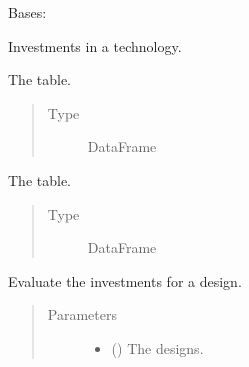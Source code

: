 \documentclass[letterpaper,10pt,english]{sphinxmanual}
\begin{document}
\begin{fulllineitems}
\label{\detokenize{doc-src/tyche:tyche.Investments.Investments}}
Bases: 

Investments in a technology.

\begin{fulllineitems}
\label{\detokenize{doc-src/tyche:tyche.Investments.Investments.tranches}}
The  table.
\begin{quote}\begin{description}
\item[{Type}] \leavevmode
DataFrame

\end{description}\end{quote}

\end{fulllineitems}


\begin{fulllineitems}
\label{\detokenize{doc-src/tyche:tyche.Investments.Investments.investments}}
The  table.
\begin{quote}\begin{description}
\item[{Type}] \leavevmode
DataFrame

\end{description}\end{quote}

\end{fulllineitems}


\begin{fulllineitems}
\label{\detokenize{doc-src/tyche:tyche.Investments.Investments.evaluate_investments}}
Evaluate the investments for a design.
\begin{quote}\begin{description}
\item[{Parameters}] \leavevmode\begin{itemize}
\item {} 
 () \textendash{} The designs.


\end{itemize}
\end{description}
\end{quote}
\end{fulllineitems}
\end{fulllineitems}
\end{document}
